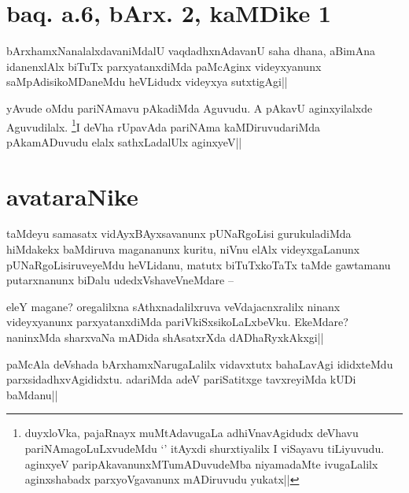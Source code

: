 \section*{baq. a.6, bArx. 2, kaMDike 1}


\begin{artha}
bArxhamxNanalalxdavaniMdalU vaqdadhxnAdavanU saha dhana, aBimAna 
idanenxlAlx biTuTx parxyatanxdiMda paMcAginx videyxyanunx 
saMpAdisikoMDaneMdu heVLidudx videyxya sutxtigAgi||
\end{artha}


\begin{artha}
yAvude oMdu pariNAmavu pAkadiMda Aguvudu. A pAkavU aginxyilalxde 
Aguvudilalx. \footnote[1]{duyxloVka, pajaRnayx muMtAdavugaLa 
adhiVnavAgidudx deVhavu pariNAmagoLuLxvudeMdu `\stext' itAyxdi 
shurxtiyalilx I viSayavu tiLiyuvudu. aginxyeV 
paripAkavanunxMTumADuvudeMba niyamadaMte ivugaLalilx aginxshabadx 
parxyoVgavanunx mADiruvudu yukatx||}I deVha rUpavAda pariNAma kaMDiruvudariMda 
pAkamADuvudu elalx sathxLadalUlx aginxyeV||
\end{artha}

\section*{avataraNike}

\begin{artha}
taMdeyu samasatx vidAyxBAyxsavanunx pUNaRgoLisi gurukuladiMda 
hiMdakekx baMdiruva magananunx kuritu, niVnu elAlx videyxgaLanunx 
pUNaRgoLisiruveyeMdu heVLidanu, matutx biTuTxkoTaTx taMde gawtamanu 
putarxnanunx biDalu udedxVshaveVneMdare --
\end{artha}

\begin{artha}
eleY magane? oregalilxna sAthxnadalilxruva veVdajacnxralilx ninanx 
videyxyanunx parxyatanxdiMda pariVkiSxsikoLaLxbeVku. EkeMdare? 
naninxMda sharxvaNa mADida shAsatxrXda dADhaRyxkAkxgi||
\end{artha}


\begin{artha}
paMcAla deVshada bArxhamxNarugaLalilx vidavxtutx bahaLavAgi ididxteMdu 
parxsidadhxvAgididxtu. adariMda adeV pariSatitxge tavxreyiMda kUDi 
baMdanu||
\end{artha}

